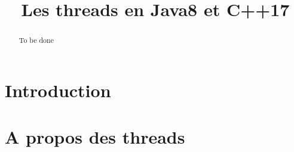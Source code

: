 \documentclass[a4paper,twoside,10pt,english,french,twocolumn]{article}
\title{Les threads en Java8 et C++17}
\author{Nicolas Potvin~\thanks\thethanks}
\date{\DTMToday}
\theoremstyle{definition}
\theoremstyle{remark}
\theoremstyle{plain}
\begin{document}
%
\let\oldproofname=\proofname
\renewcommand{\proofname}{\bfseries\oldproofname}
\renewcommand{\listfigurename}{Liste des schémas}
\renewcommand{\listtablename}{Liste des tables}
\renewcommand{\lstlistingname}{Programme}
\renewcommand{\lstlistlistingname}{Liste des programmes}
%
\maketitle
%
\begin{abstract}
To be done
\end{abstract}

\section{Introduction}


\section{A propos des threads}
\end{document}
